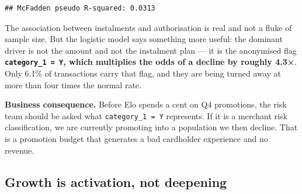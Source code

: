 \documentclass[
]{article}
\newenvironment{Shaded}{\begin{snugshade}}{\end{snugshade}}
\newcommand{\DecValTok}[1]{\textcolor[rgb]{0.00,0.00,0.81}{#1}}
\newcommand{\FunctionTok}[1]{\textcolor[rgb]{0.13,0.29,0.53}{\textbf{#1}}}
\newcommand{\NormalTok}[1]{#1}
\newcommand{\SpecialCharTok}[1]{\textcolor[rgb]{0.81,0.36,0.00}{\textbf{#1}}}
\newcommand{\StringTok}[1]{\textcolor[rgb]{0.31,0.60,0.02}{#1}}
\begin{document}
\begin{Shaded}
\end{Shaded}

\begin{verbatim}
## McFadden pseudo R-squared: 0.0313
\end{verbatim}

The association between instalments and authorisation is real and not a
fluke of sample size. But the logistic model says something more useful:
the dominant driver is not the amount and not the instalment plan --- it
is the anonymised flag \textbf{\texttt{category\_1\ =\ Y}, which
multiplies the odds of a decline by roughly 4.3×}. Only 6.1\% of
transactions carry that flag, and they are being turned away at more
than four times the normal rate.

\textbf{Business consequence.} Before Elo spends a cent on Q4
promotions, the risk team should be asked what
\texttt{category\_1\ =\ Y} represents. If it is a merchant risk
classification, we are currently promoting into a population we then
decline. That is a promotion budget that generates a bad cardholder
experience and no revenue.

\subsection{Growth is activation, not
deepening}\label{growth-is-activation-not-deepening}
\end{document}
